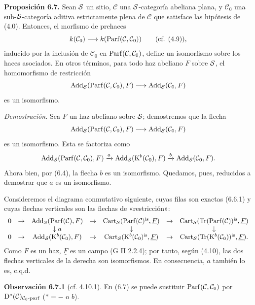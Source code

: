 \textbf{Proposición 6.7.} Sean \(\sisi{S}{\mathcal S}\) un sitio, \(\mathcal C\) una \(\sisi{S}{\mathcal S}\)-categoría abeliana plana, y \(\mathcal C_0\) una sub-\(\sisi{S}{\mathcal S}\)-categoría aditiva estrictamente plena de \(\mathcal C\) que satisface las hipótesis de (4.0). Entonces, el morfismo de prehaces
\[
  k(\mathcal C_0)\longrightarrow k(\Parf(\mathcal C,\mathcal C_0))\qquad(\text{cf. }(4.9)),
\]
inducido por la inclusión de \(\mathcal C_0\) en \(\Parf(\mathcal C,\mathcal C_0)\), define un isomorfismo sobre los haces asociados. En otros términos, para todo haz abeliano \(F\) sobre \(\sisi{S}{\mathcal S}\), el homomorfismo de restricción
\[
  \Add\sisi{_S}{_{\mathcal S}}(\Parf(\mathcal C,\mathcal C_0),F)
  \longrightarrow
  \Add\sisi{_S}{_{\mathcal S}}(\mathcal C_0,F)
\]
es un isomorfismo.

\emph{Demostración.} Sea \(F\) un haz abeliano sobre \(\sisi{S}{\mathcal S}\); demostremos que la flecha
\[
  \Add\sisi{_S}{_{\mathcal S}}(\Parf(\mathcal C,\mathcal C_0),F)
  \longrightarrow
  \Add\sisi{_S}{_{\mathcal S}}(\mathcal C_0,F)
\]
es un isomorfismo. Esta se factoriza como
\[
\Add\sisi{_S}{_{\mathcal S}}(\Parf(\mathcal C,\mathcal C_0),F)
 \xrightarrow{a}
\Add\sisi{_S}{_{\mathcal S}}(\Kpx^b(\mathcal C_0),F)
 \xrightarrow{b}
\Add\sisi{_S}{_{\mathcal S}}(\mathcal C_0,F).
\]
Ahora bien, por (6.4), la flecha \(b\) es un isomorfismo. Quedamos, pues, reducidos a demostrar que \(a\) es un isomorfismo.

Consideremos el diagrama conmutativo siguiente, cuyas filas son exactas (6.6.1) y cuyas flechas verticales son las flechas de «restricción»:
\[
\begin{array}{ccccccccc}
0&\to&\Add\sisi{_S}{_{\mathcal S}}(\Parf(\mathcal C),F)&\to&\Cart\sisi{_S}{_{\mathcal S}}(\Parf(\mathcal C)^{\is},\underline F)&\to&\Cart\sisi{_S}{_{\mathcal S}}(\Tr(\Parf(\mathcal C))^{\is},\underline F)\\
&&\downarrow a&&\downarrow&&\downarrow\\
0&\to&\Add\sisi{_S}{_{\mathcal S}}(\Kpx^b(\mathcal C_0),F)&\to&\Cart\sisi{_S}{_{\mathcal S}}(\Kpx^b(\mathcal C_0)^{\is},\underline F)&\to&\Cart\sisi{_S}{_{\mathcal S}}(\Tr(\Kpx^b(\mathcal C_0))^{\is},\underline F).
\end{array}
\]
Como \(F\) es un haz, \(\underline F\) es un campo (G II 2.2.4); por tanto, según (4.10), las dos flechas verticales de la derecha son isomorfismos. En consecuencia, \(a\) también lo es, c.q.d.

\textbf{Observación 6.7.1} (cf. 4.10.1). En (6.7) se puede sustituir \(\Parf(\mathcal C,\mathcal C_0)\) por \(\Dpx^*(\mathcal C)_{\mathcal C_0\text{-}\mathrm{parf}}\) (\(*=-\) o \(b\)).

